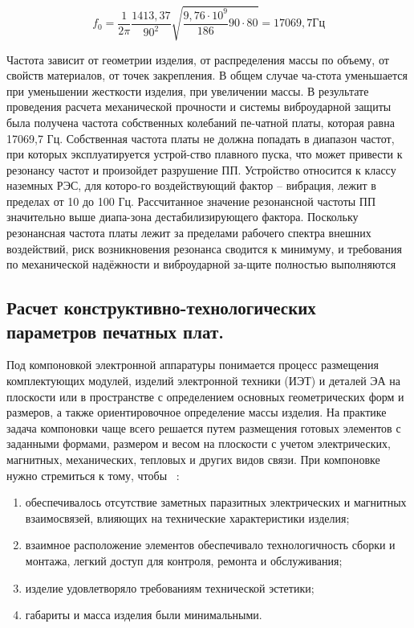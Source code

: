 $$f_0= \frac{1}{2\pi}\frac{1413,37}{90^2}\sqrt{\frac{9,76 \cdot 10^9}{186} 90 \cdot 80}=17069,7Гц$$

Частота зависит от геометрии изделия, от распределения массы по
объему, от свойств материалов, от точек закрепления. В общем случае
ча-стота уменьшается при уменьшении жесткости изделия, при увеличении
массы.  В результате проведения расчета механической прочности и
системы виброударной защиты была получена частота собственных
колебаний пе-чатной платы, которая равна 17069,7 Гц. Собственная
частота платы не должна попадать в диапазон частот, при которых
эксплуатируется устрой-ство плавного пуска, что может привести к
резонансу частот и произойдет разрушение ПП. Устройство относится к
классу наземных РЭС, для которо-го воздействующий фактор – вибрация,
лежит в пределах от 10 до 100 Гц. Рассчитанное значение резонансной
частоты ПП значительно выше диапа-зона дестабилизирующего фактора.
Поскольку резонансная частота платы лежит за пределами рабочего
спектра внешних воздействий, риск возникновения резонанса сводится к
минимуму, и требования по механической надёжности и виброударной
за-щите полностью выполняются


\subsection{Расчет конструктивно-технологических параметров печатных плат. }

Под компоновкой электронной аппаратуры понимается процесс размещения
комплектующих модулей, изделий электронной техники (ИЭТ) и деталей ЭА
на плоскости или в пространстве с определением основных геометрических
форм и размеров, а также ориентировочное определение массы изделия.
На практике задача компоновки чаще всего решается путем размещения
готовых элементов с заданными формами, размером и весом на плоскости с
учетом электрических, магнитных, механических, тепловых и других видов
связи. При компоновке нужно стремиться к тому, чтобы ~\cite{Kostukevich2012}:
\begin{enumerate}
\item обеспечивалось отсутствие заметных паразитных электрических и магнитных взаимосвязей,
  влияющих на технические характеристики изделия;
  
\item взаимное расположение элементов обеспечивало технологичность сборки и монтажа,
  легкий доступ для контроля, ремонта и обслуживания;
  
\item изделие удовлетворяло требованиям технической эстетики;
\item габариты и масса изделия были минимальными.
\end{enumerate}

